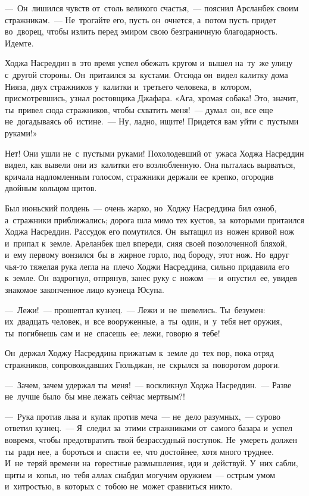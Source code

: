\documentclass[12pt,a4paper]{book}
\begin{document}
—~Он~лишился чувств от~столь великого счастья,~— пояснил Арсланбек своим стражникам.~— Не~трогайте его, пусть он~очнется, а~потом пусть придет во~дворец, чтобы излить перед эмиром свою безграничную благодарность. Идемте.

Ходжа Насреддин в~это время успел обежать кругом и~вышел на~ту~же улицу с~другой стороны. Он~притаился за~кустами. Отсюда он~видел калитку дома Нияза, двух стражников у~калитки и~третьего человека, в~котором, присмотревшись, узнал ростовщика Джафара. «Ага, хромая собака! Это, значит, ты~привел сюда стражников, чтобы схватить меня!~— думал~он, все еще не~догадываясь об~истине.~— Ну, ладно, ищите! Придется вам уйти с~пустыми руками!»

Нет! Они ушли не~с~пустыми руками! Похолодевший от~ужаса Ходжа Насреддин видел, как вывели они из~калитки его возлюбленную. Она пыталась вырваться, кричала надломленным голосом, стражники держали ее~крепко, огородив двойным кольцом щитов.

Был июньский полдень~— очень жарко, но~Ходжу Насреддина бил озноб, а~стражники приближались; дорога шла мимо тех кустов, за~которыми притаился Ходжа Насреддин. Рассудок его помутился. Он~вытащил из~ножен кривой нож и~припал к~земле. Ареланбек шел впереди, сияя своей позолоченной бляхой, и~ему первому вонзился~бы в~жирное горло, под бороду, этот нож. Но~вдруг чья-то тяжелая рука легла на~плечо Ходжи Насреддина, сильно придавила его к~земле. Он~вздрогнул, отпрянув, занес руку с~ножом~— и~опустил~ее, увидев знакомое закопченное лицо куэнеца Юсупа.

—~Лежи!~— прошептал кузнец.~— Лежи и~не~шевелись. Ты~безумен: их~двадцать человек, и~все вооруженные, а~ты~один, и~у~тебя нет оружия, ты~погибнешь сам и~не~спасешь~ее; лежи, говорю я~тебе!

Он~держал Ходжу Насреддина прижатым к~земле до~тех пор, пока отряд стражников, сопровождавших Гюльджан, не~скрылся за~поворотом дороги.

—~Зачем, зачем удержал ты~меня!~— воскликнул Ходжа Насреддин.~— Разве не~лучше было~бы мне лежать сейчас мертвым?!

—~Рука против льва и~кулак против меча~— не~дело разумных,~— сурово ответил кузнец.~— Я~следил за~этими стражниками от~самого базара и~успел вовремя, чтобы предотвратить твой безрассудный поступок. Не~умереть должен ты~ради нее, а~бороться и~спасти~ее, что достойнее, хотя много труднее. И~не~теряй времени на~горестные размышления, иди и~действуй. У~них сабли, щиты и~копья, но~тебя аллах снабдил могучим оружием~— острым умом и~хитростью, в~которых с~тобою не~может сравниться никто.
\end{document}
